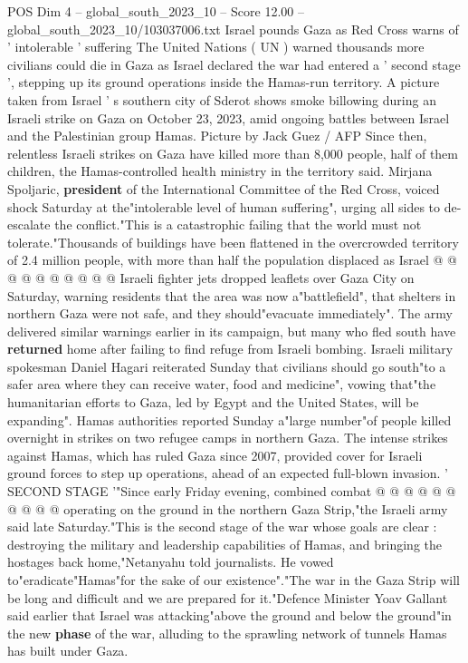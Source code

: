 \begin{textsample}{POS Dim 4 – global\_south\_2023\_10 – Score 12.00 – global\_south\_2023\_10/103037006.txt}  \label{ex:f4_pos_436}
Israel pounds Gaza as Red Cross warns of ' intolerable ' suffering The United Nations ( UN ) warned thousands more civilians could die in Gaza as Israel declared the war had entered a ' second stage ', stepping up its ground operations inside the Hamas-run territory.
A picture taken from Israel ' s southern city of Sderot shows smoke billowing during an Israeli strike on Gaza on October 23, 2023, amid ongoing battles between Israel and the Palestinian group Hamas.
Picture by Jack Guez / AFP Since then, relentless Israeli strikes on Gaza have killed more than 8,000 people, half of them children, the Hamas-controlled health ministry in the territory said.
Mirjana Spoljaric, \textbf{president} of the International Committee of the Red Cross, voiced shock Saturday at the"intolerable level of human suffering", urging all sides to de-escalate the conflict."This is a catastrophic failing that the world must not tolerate."Thousands of buildings have been flattened in the overcrowded territory of 2.4 million people, with more than half the population displaced as Israel @ @ @ @ @ @ @ @ @ @ Israeli fighter jets dropped leaflets over Gaza City on Saturday, warning residents that the area was now a"battlefield", that shelters in northern Gaza were not safe, and they should"evacuate immediately".
The army delivered similar warnings earlier in its campaign, but many who fled south have \textbf{returned} home after failing to find refuge from Israeli bombing.
Israeli military spokesman Daniel Hagari reiterated Sunday that civilians should go south"to a safer area where they can receive water, food and medicine", vowing that"the humanitarian efforts to Gaza, led by Egypt and the United States, will be expanding".
Hamas authorities reported Sunday a"large number"of people killed overnight in strikes on two refugee camps in northern Gaza.
The intense strikes against Hamas, which has ruled Gaza since 2007, provided cover for Israeli ground forces to step up operations, ahead of an expected full-blown invasion. ' SECOND STAGE '"Since early Friday evening, combined combat @ @ @ @ @ @ @ @ @ @ operating on the ground in the northern Gaza Strip,"the Israeli army said late Saturday."This is the second stage of the war whose goals are clear : destroying the military and leadership capabilities of Hamas, and bringing the hostages back home,"Netanyahu told journalists.
He vowed to"eradicate"Hamas"for the sake of our existence"."The war in the Gaza Strip will be long and difficult and we are prepared for it."Defence Minister Yoav Gallant said earlier that Israel was attacking"above the ground and below the ground"in the new \textbf{phase} of the war, alluding to the sprawling network of tunnels Hamas has built under Gaza.

\end{textsample}
